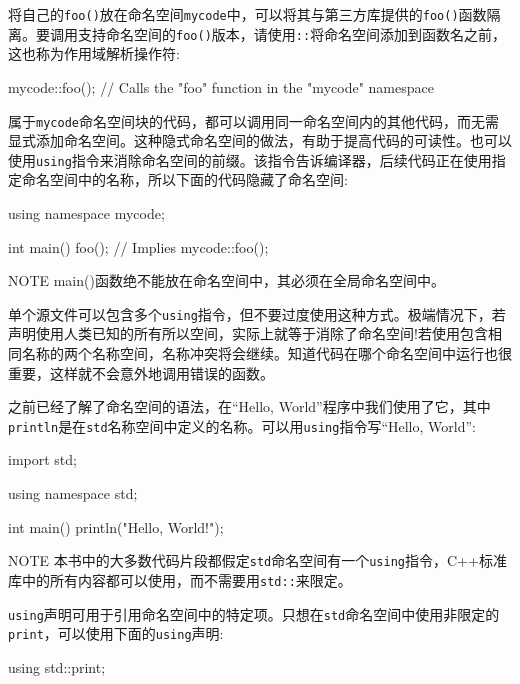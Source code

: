 将自己的\verb|foo()|放在命名空间\verb|mycode|中，可以将其与第三方库提供的\verb|foo()|函数隔离。要调用支持命名空间的\verb|foo()|版本，请使用\verb|::|将命名空间添加到函数名之前，这也称为作用域解析操作符:

\begin{cpp}
mycode::foo(); // Calls the "foo" function in the "mycode" namespace
\end{cpp}

属于\verb|mycode|命名空间块的代码，都可以调用同一命名空间内的其他代码，而无需显式添加命名空间。这种隐式命名空间的做法，有助于提高代码的可读性。也可以使用\verb|using|指令来消除命名空间的前缀。该指令告诉编译器，后续代码正在使用指定命名空间中的名称，所以下面的代码隐藏了命名空间:

\begin{cpp}
using namespace mycode;

int main()
{
    foo(); // Implies mycode::foo();
}
\end{cpp}

\begin{myNotic}{NOTE}
main()函数绝不能放在命名空间中，其必须在全局命名空间中。
\end{myNotic}

单个源文件可以包含多个\verb|using|指令，但不要过度使用这种方式。极端情况下，若声明使用人类已知的所有所以空间，实际上就等于消除了命名空间!若使用包含相同名称的两个名称空间，名称冲突将会继续。知道代码在哪个命名空间中运行也很重要，这样就不会意外地调用错误的函数。

之前已经了解了命名空间的语法，在“Hello, World”程序中我们使用了它，其中\verb|println|是在\verb|std|名称空间中定义的名称。可以用\verb|using|指令写“Hello, World”:

\begin{cpp}
import std;

using namespace std;

int main()
{
    println("Hello, World!");
}
\end{cpp}

\begin{myNotic}{NOTE}
本书中的大多数代码片段都假定\verb|std|命名空间有一个\verb|using|指令，C++标准库中的所有内容都可以使用，而不需要用\verb|std::|来限定。
\end{myNotic}

\verb|using|声明可用于引用命名空间中的特定项。只想在\verb|std|命名空间中使用非限定的\verb|print|，可以使用下面的\verb|using|声明:

\begin{cpp}
using std::print;
\end{cpp}

